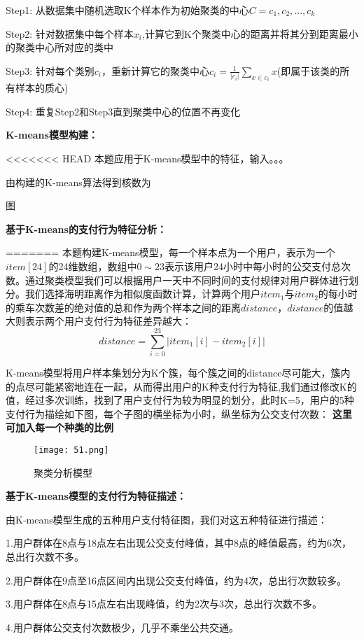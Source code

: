 \documentclass[withoutpreface,bwprint]{cumcmthesis} %
\begin{document}
Step1: 从数据集中随机选取K个样本作为初始聚类的中心$C={c_1,c_2,...,c_k}$

Step2: 针对数据集中每个样本$x_i$,计算它到K个聚类中心的距离并将其分到距离最小的聚类中心所对应的类中

Step3: 针对每个类别$c_i$，重新计算它的聚类中心$c_i=\frac{1}{\left|c_i\right|}\sum_{x \in c_i}x$(即属于该类的所有样本的质心)

Step4: 重复Step2和Step3直到聚类中心的位置不再变化

\textbf{K-means模型构建：}

<<<<<<< HEAD
本题应用于K-means模型中的特征，输入。。。

由构建的K-means算法得到核数为

图

\textbf{基于K-means的支付行为特征分析：}


=======
本题构建K-means模型，每一个样本点为一个用户，表示为一个$item[24]$的24维数组，数组中$0\sim23$表示该用户24小时中每小时的公交支付总次数。通过聚类模型我们可以根据用户一天中不同时间的支付规律对用户群体进行划分。我们选择海明距离作为相似度函数计算，计算两个用户$item_1$与$item_2$的每小时的乘车次数差的绝对值的总和作为两个样本之间的距离$distance$，$distance$的值越大则表示两个用户支付行为特征差异越大：
\begin{equation}
distance=\sum_{i=0}^{23}|item_1[i]-item_2[i]|
\end{equation}

K-means模型将用户样本集划分为K个簇，每个簇之间的distance尽可能大，簇内的点尽可能紧密地连在一起，从而得出用户的K种支付行为特征,我们通过修改K的值，经过多次训练，找到了用户支付行为较为明显的划分，此时K=5，用户的5种支付行为描绘如下图，每个子图的横坐标为小时，纵坐标为公交支付次数：
\textbf{这里可加入每一个种类的比例}
\begin{figure}[h]
\centering
\texttt{[image: 51.png]}
\caption{聚类分析模型}
\end{figure}

\textbf{基于K-means模型的支付行为特征描述：}

由K-means模型生成的五种用户支付特征图，我们对这五种特征进行描述：

1.用户群体在8点与18点左右出现公交支付峰值，其中8点的峰值最高，约为6次，总出行次数不多。

2.用户群体在9点至16点区间内出现公交支付峰值，约为4次，总出行次数较多。

3.用户群体在8点与15点左右出现峰值，约为2次与3次，总出行次数不多。

4.用户群体公交支付次数极少，几乎不乘坐公共交通。
\end{document}
